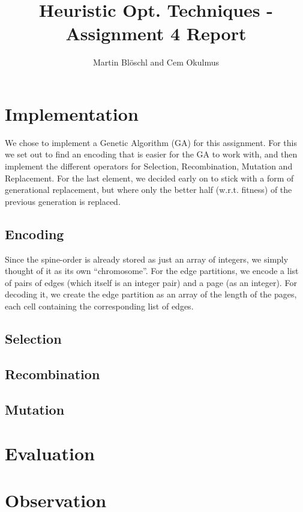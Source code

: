 \documentclass [11pt]{article}
\begin{document}
\title{ Heuristic Opt. Techniques - Assignment 4 Report}
\author{ Martin Blöschl and Cem Okulmus }

\maketitle
\thispagestyle{empty}


\section{Implementation}
We chose to implement a Genetic Algorithm (GA) for this assignment. For this we set out to find an encoding that is easier for the GA to work with, and then implement the different operators for Selection, Recombination, Mutation and Replacement. For the last element, we decided early on to stick with a form of generational replacement, but where only the better  half  (w.r.t. fitness) of the previous generation is replaced. 

\subsection{Encoding}

Since the spine-order is already stored as just an array of integers, we simply thought of it as its own ``chromosome''. For the edge partitions, we encode a list of pairs of edges (which itself is an integer pair) and a page (as an integer). For decoding it, we create the edge partition as an array of the length of the pages, each cell containing the corresponding list of edges. 

\subsection{Selection}

\subsection{Recombination}

\subsection{Mutation}

\section{Evaluation}

\section{Observation}
\end{document}
